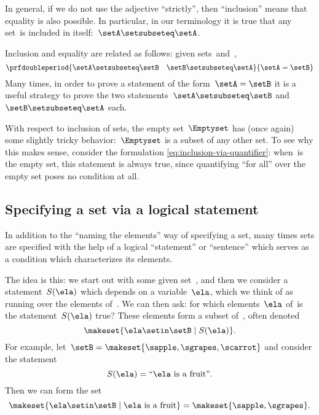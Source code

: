 In general, if we do not use the adjective ``strictly'', then ``inclusion'' means that equality is also possible.
In particular, in our terminology it is true that any set~\setA is included in itself:~$\setA \setsubseteq \setA$.

Inclusion and equality are related as follows: given sets~\setA and~\setB,
%
\begin{equation}
    \prfdoubleperiod
    {\setA \setsubseteq \setB
        \quad
        \setB \setsubseteq \setA}{
        \setA = \setB}
\end{equation}
%
Many times, in order to prove a statement of the form~$\setA = \setB$ it is a useful strategy to prove the two statements~$\setA \setsubseteq \setB$ and~$\setB \setsubseteq \setA$ each.

With respect to inclusion of sets, the empty set~$\Emptyset$ has (once again) some slightly tricky behavior:~$\Emptyset$ is a subset of any other set.
To see why this makes sense, consider the formulation \cref{eq:inclusion-via-quantifier}: when~\setA is the empty set, this statement is always true, since quantifying ``for all'' over the empty set poses no condition at all.

\subsection{Specifying a set via a logical statement}

In addition to the ``naming the elements'' way of specifying a set, many times sets are specified with the help of a logical ``statement'' or ``sentence'' which serves as a condition which characterizes its elements.

The idea is this: we start out with some given set~\setB, and then we consider a statement~$S(\ela)$ which depends on a variable~$\ela$, which we think of as running over the elements of~\setB.
We can then ask: for which elements~$\ela$ of~\setB is the statement~$S(\ela)$ true?
These elements form a subset of~\setB, often denoted
%
\begin{equation}
    \label{eq:axiom-specialization}
    \makeset{ \ela \setin\setB \mid S(\ela) }.
\end{equation}
%
For example, let~$\setB = \makeset{ \sapple, \sgrapes, \scarrot}$ and consider the statement
%
\begin{equation}
    S(\ela) = \text{``$\ela$ is a fruit''}.
\end{equation}
%
Then we can form the set
%
\begin{equation}
    \makeset{ \ela \setin\setB \mid \ela \text{ is a fruit} } = \makeset{ \sapple, \sgrapes }.
\end{equation}

